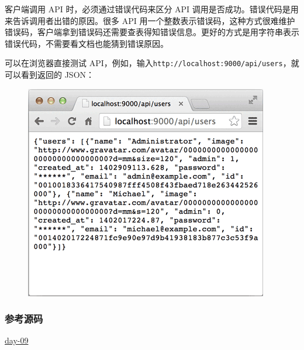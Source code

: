 客户端调用 API 时，必须通过错误代码来区分 API
调用是否成功。错误代码是用来告诉调用者出错的原因。很多 API
用一个整数表示错误码，这种方式很难维护错误码，客户端拿到错误码还需要查表得知错误信息。更好的方式是用字符串表示错误代码，不需要看文档也能猜到错误原因。

可以在浏览器直接测试
API，例如，输入\texttt{http://localhost:9000/api/users}，就可以看到返回的
JSON：

 
 \begin{figure}[htp]
	\centering
	\includegraphics[width=0.6\linewidth]{fig/955712165379744.png}
\end{figure}


\hypertarget{ux53c2ux8003ux6e90ux7801}{%
\subsubsection{参考源码}\label{ux53c2ux8003ux6e90ux7801}}

\href{https://github.com/michaelliao/awesome-python3-webapp/tree/day-09}{day-09}

